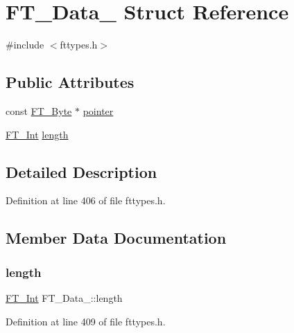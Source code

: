\hypertarget{struct_f_t___data__}{}\section{F\+T\+\_\+\+Data\+\_\+ Struct Reference}
\label{struct_f_t___data__}


{\ttfamily \#include $<$fttypes.\+h$>$}

\subsection*{Public Attributes}
\begin{DoxyCompactItemize}
\item 
const \mbox{\hyperlink{fttypes_8h_a51f26183ca0c9f4af958939648caeccd}{F\+T\+\_\+\+Byte}} $\ast$ \mbox{\hyperlink{struct_f_t___data___a4dea731b8a256b973757e1b8f612b050}{pointer}}
\item 
\mbox{\hyperlink{fttypes_8h_af90e5fb0d07e21be9fe6faa33f02484c}{F\+T\+\_\+\+Int}} \mbox{\hyperlink{struct_f_t___data___af60c89dccd1852aceb0dc08675aca2fd}{length}}
\end{DoxyCompactItemize}


\subsection{Detailed Description}


Definition at line 406 of file fttypes.\+h.



\subsection{Member Data Documentation}
\mbox{\label{struct_f_t___data___af60c89dccd1852aceb0dc08675aca2fd}} 
\subsubsection{\texorpdfstring{length}{length}}
{\footnotesize\ttfamily \mbox{\hyperlink{fttypes_8h_af90e5fb0d07e21be9fe6faa33f02484c}{F\+T\+\_\+\+Int}} F\+T\+\_\+\+Data\+\_\+\+::length}



Definition at line 409 of file fttypes.\+h.

\mbox{\label{struct_f_t___data___a4dea731b8a256b973757e1b8f612b050}} 

